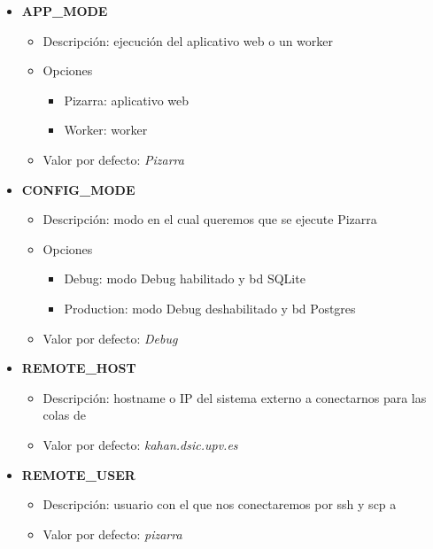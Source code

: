 \documentclass[11pt,spanish,listoffigures,listoftables]{tfgetsinf}
\begin{document}
\begin{itemize}
	\item \textbf{APP\_MODE}
	\begin{itemize}
		\item Descripción: ejecución del aplicativo web o un worker
		\item Opciones
		\begin{itemize}
			\item Pizarra: aplicativo web
			\item Worker: worker
		\end{itemize}
		\item Valor por defecto: \textit{Pizarra}
	\end{itemize}
\end{itemize}

\begin{itemize}
	\item \textbf{CONFIG\_MODE}
	\begin{itemize}
		\item Descripción: modo en el cual queremos que se ejecute Pizarra
		\item Opciones
		\begin{itemize}
			\item Debug: modo Debug habilitado y \acrfull{bd} SQLite
			\item Production: modo Debug deshabilitado y \acrfull{bd} Postgres
		\end{itemize}
		\item Valor por defecto: \textit{Debug}
	\end{itemize}
\end{itemize}

\begin{itemize}
	\item \textbf{REMOTE\_HOST}
	\begin{itemize}
		\item Descripción: hostname o IP del sistema externo a conectarnos para las colas de \kahan
		\item Valor por defecto: \textit{kahan.dsic.upv.es}
	\end{itemize}
\end{itemize}

\begin{itemize}
	\item \textbf{REMOTE\_USER}
	\begin{itemize}
		\item Descripción: usuario con el que nos conectaremos por \acrshort{ssh} y \acrshort{scp} a \kahan
		\item Valor por defecto: \textit{pizarra}
	\end{itemize}
\end{itemize}
\end{document}
